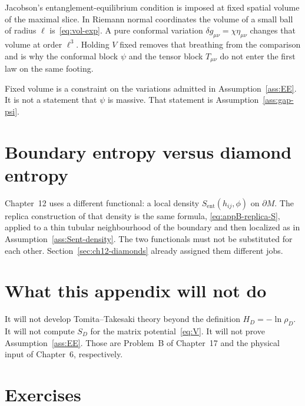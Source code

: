 Jacobson's entanglement-equilibrium condition is imposed at fixed
spatial volume of the maximal slice. In Riemann normal coordinates
the volume of a small ball of radius \(\ell\) is~\eqref{eq:vol-exp}.
A pure conformal variation \(\delta g_{\mu\nu}=\chi\eta_{\mu\nu}\)
changes that volume at order \(\ell^3\). Holding \(V\) fixed
removes that breathing from the comparison and is why the conformal
block \(\psi\) and the tensor block \(T_{\mu\nu}\) do not enter
the first law on the same footing.

Fixed volume is a constraint on the variations admitted in
Assumption~\ref{ass:EE}. It is not a statement that \(\psi\) is
massive. That statement is Assumption~\ref{ass:gap-psi}.

\section{Boundary entropy versus diamond entropy}
\label{sec:appB-two}

Chapter~12 uses a different functional: a local density
\(S_{\mathrm{ent}}(h_{ij},\phi)\) on \(\partial M\). The replica
construction of that density is the same formula,
\eqref{eq:appB-replica-S}, applied to a thin tubular neighbourhood
of the boundary and then localized as in
Assumption~\ref{ass:Sent-density}. The two functionals must not be
substituted for each other. Section~\ref{sec:ch12-diamonds}
already assigned them different jobs.

\section{What this appendix will not do}
\label{sec:appB-not}

It will not develop Tomita--Takesaki theory beyond the definition
\(H_D=-\ln\rho_D\). It will not compute \(S_D\) for the matrix
potential~\eqref{eq:V}. It will not prove Assumption~\ref{ass:EE}.
Those are Problem~B of Chapter~17 and the physical input of
Chapter~6, respectively.

\section{Exercises}
\label{sec:appB-exercises}

